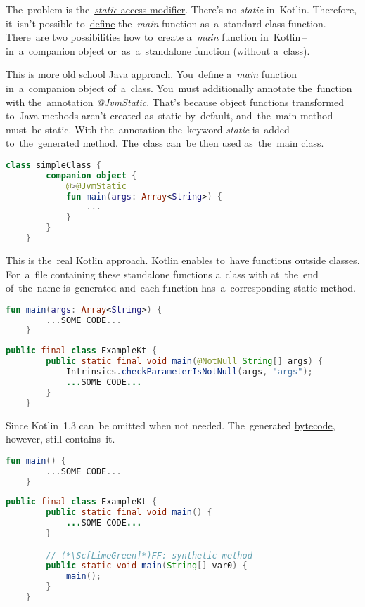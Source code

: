 \noindent The~problem is the~\hyperref[javastatic]{\textit{static} access modifier}.
There's no \textit{static} in~Kotlin.
Therefore, it~isn't possible to~\hyperref[declarationdefinition]{define} the~\textit{main} function as~a~standard class function.
There~are two possibilities how to~create a~\textit{main} function in~Kotlin\,--\,in~a~\hyperref[companionobject]{companion object} or~as~a~standalone function (without a~class).

This is more old school Java approach.
You~define a~\textit{main} function in~a~\hyperref[companionobject]{companion object} of~a~class.
You~must additionally annotate the~function with the~annotation \textit{@JvmStatic}.
That's because object functions transformed to~Java methods aren't created as~static by~default, and~the~main method must~be static.
With the~annotation the~keyword \textit{static} is~added to~the~generated method.
The~class can~be then used as~the~main class.

\begin{lstlisting}[language=Kotlin,title={Main function in~a~companion object}]
    class simpleClass {
        companion object {
            @>@JvmStatic
            fun main(args: Array<String>) {
                ...
            }
        }
    }
\end{lstlisting}

This is the~real Kotlin approach.
Kotlin enables to~have functions outside classes.
For~a~file containing these standalone functions a~class with  at~the~end of~the~name is~generated and~each function has~a~corresponding static method.

\begin{lstlisting}[language=Kotlin,title={A~tandalone main function in a~file \textit{Example.kt}}]
    fun main(args: Array<String>) {
        ...SOME CODE...
    }
\end{lstlisting}

\begin{lstlisting}[language=Java,title={Corresponding Java code}]
    public final class ExampleKt {
        public static final void main(@NotNull String[] args) {
            Intrinsics.checkParameterIsNotNull(args, "args");
            ...SOME CODE...
        }
    }
\end{lstlisting}

\noindent Since Kotlin~1.3  can~be omitted when not needed.
The~generated \hyperref[bytecode]{bytecode}, however, still contains~it.

\begin{lstlisting}[language=Kotlin,title={A~tandalone main function without \mbit{args}}]
    fun main() {
        ...SOME CODE...
    }
\end{lstlisting}

\begin{lstlisting}[language=Java,title={Corresponding Java code}]
    public final class ExampleKt {
        public static final void main() {
            ...SOME CODE...
        }

        // (*\Sc[LimeGreen]*)FF: synthetic method
        public static void main(String[] var0) {
            main();
        }
    }
\end{lstlisting}
